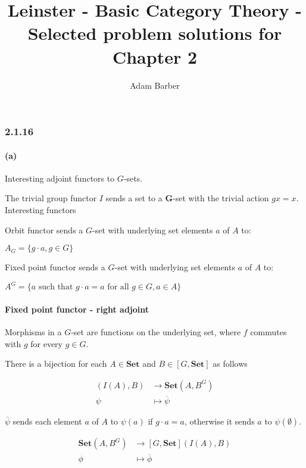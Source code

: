 \documentclass{article}
\begin{document}
\title{Leinster - Basic Category Theory - Selected problem solutions for Chapter 2}
\author{Adam Barber}

\maketitle
\subsubsection*{2.1.16}
\paragraph{(a)}

Interesting adjoint functors to $G$-sets.

The trivial group functor $I$ sends a set to a $\mathbf{G}$-set with the trivial action $gx = x$. Interesting functors

Orbit functor sends a $G$-set with underlying set elements $a$ of $A$ to:

$A_G = \{ g \cdot a, g \in G \}$

Fixed point functor sends a $G$-set  with underlying set elements $a$ of $A$ to:

$A^G = \{ a \text{ such that } g \cdot a = a \text{ for all } g \in G, a \in A \}$

\paragraph{Fixed point functor - right adjoint}

Morphisms in a $G$-set are functions on the underlying set, where $f$ commutes with $g$ for every $g \in G$.

There is a bijection for each $A \in \mathbf{Set}$ and $B \in [G, \mathbf{Set}]$ as follows

\begin{align*}
  [G, \mathbf{Set}](I(A), B) &\rightarrow \mathbf{Set}(A, B^G) \\
  \psi &\mapsto \overline{\psi}
\end{align*}

$\overline{\psi}$ sends each element $a$ of $A$ to $\psi(a)$ if $g \cdot a = a$, otherwise it sends $a$ to $\psi(\emptyset)$.

\begin{align*}
  \mathbf{Set}(A, B^G) &\rightarrow [G, \mathbf{Set}](I(A), B) \\
  \phi &\mapsto \overline{\phi}
\end{align*}
\end{document}
